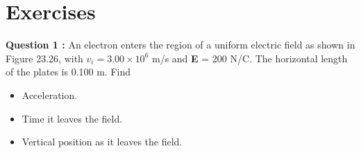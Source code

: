 \documentclass[12pt,a4paper]{article}
\begin{document}
\section{Exercises}
\noindent\textbf{Question 1 \cite[Example 23.11, page 727]{Serway}:} An electron enters the region of a uniform electric field as shown in Figure 23.26, with $v_i = 3.00 \times 10^6$ m/s and \textbf{E} = 200 N/C. The horizontal length of the plates is 0.100 m. Find
\begin{itemize}
\item Acceleration.
\item Time it leaves the field.
\item Vertical position as it leaves the field.
\end{itemize}


\end{document}
